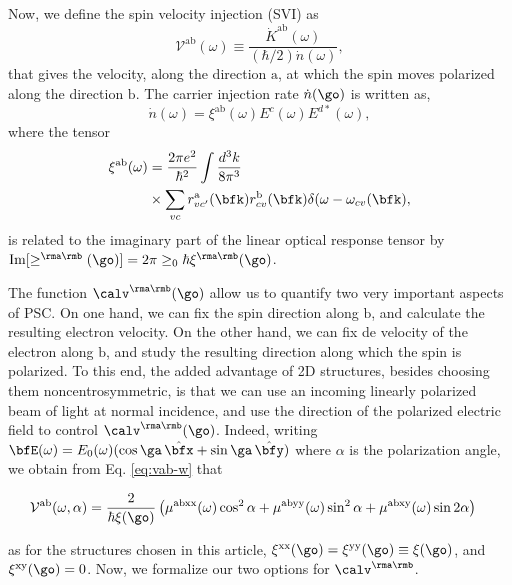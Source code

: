 \documentclass[prb,11pt,tightenlines,twocolumn,aps]{revtex4-1}
\begin{document}
Now, we define the spin velocity injection (SVI) as
\begin{equation}\label{eq:vab-w}
\mathcal{V}^{\mathrm{ab}}(\omega) \equiv
\frac{\dot{K}^{\mathrm{ab}}(\omega)}{(\hbar/2) \dot{n}(\omega)},
\end{equation}  
that gives 
the velocity, along the direction $\mathrm{a}$, at which the spin moves polarized along the 
direction $\mathrm{b}$.
The carrier injection rate $\dot n(\go)$ is written as,\cite{nastosPRB05}
\begin{equation}
\dot{n}(\omega) =
\xi^{\mathrm{ab}}(\omega) E^{c }(\omega) E^{d*}(\omega),
\label{eq:dotn}
\end{equation}
where the tensor 
\begin{equation}\label{eq:xi}
\begin{aligned}
\xi^{\mathrm{ab}}(\omega)
&
=
\frac{2\pi e^{2}}{\hbar^{2}} \int 
\frac{d^{3}k}{8 \pi^{3}}
\\\nonumber
&\times \sum_{vc}
r^{\mathrm{a}}_{vc'}(\bfk)  
r^{\mathrm{b}}_{cv }(\bfk)  
\delta(\omega-\omega_{cv}(\bfk) 
, 
\end{aligned}
\end{equation}
is related to the imaginary part of the linear optical 
response tensor by
$\mathrm{Im}[\ge^{\rma\rmb}(\go)]=2\pi\ge_0\hbar\xi^{\rma\rmb}(\go)$.

The function $\calv^{\rma\rmb}(\go)$ allow us to quantify two very
important aspects of PSC. On one hand, we can fix the spin direction
along $\mathrm{b}$,   
and calculate the resulting electron velocity.  
On the other hand, we can fix de velocity of the electron
along $\mathrm{b}$,  and study the resulting direction along which the
spin is polarized.
To this end, the added advantage of  2D structures, besides choosing
them noncentrosymmetric, is that we can use an incoming linearly
polarized beam of light
at normal incidence, and use the  direction of the polarized  electric
field to control $\calv^{\rma\rmb}(\go)$.
Indeed, writing 
$\bfE(\omega) = E_0(\omega)(\cos\ga\,\hat\bfx+\sin\ga\,\hat\bfy)$
where $\alpha$ is the polarization angle, we obtain from
 Eq. \eqref{eq:vab-w}
that
\begin{widetext}
\begin{align}
\mathcal{V}^{\mathrm{ab}}(\omega,\alpha)
&= 
\frac{2}{\hbar\xi(\go)}
\left(\mu^{\mathrm{abxx}}(\omega)\cos^{2}\alpha + 
\mu^{\mathrm{abyy}}(\omega)\sin^{2}\alpha + 
\mu^{\mathrm{abxy}}(\omega)\sin 2\alpha\right)
\label{eq:vab-aw}
\end{align}
\end{widetext}
as for the structures chosen in this article,
$\xi^{\mathrm{xx}}(\go)=\xi^{\mathrm{yy}}(\go)\equiv\xi(\go)$, and $\xi^{\mathrm{xy}}(\go)=0$.
Now, we formalize our two options for $\calv^{\rma\rmb}$.
% 
\end{document}
